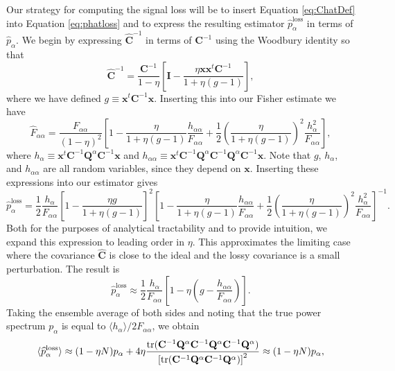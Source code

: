 \documentclass[preprint2,numberedappendix,tighten]{aastex6}  %
\newcommand{\x}{\mathbf{x}}
\newcommand{\C}{\mathbf{C}}
\newcommand{\Chat}{\mathbf{\widehat{C}}}
\newcommand{\Q}{\mathbf{Q}}
\newcommand{\I}{\mathbf{I}}
\begin{document}
Our strategy for computing the signal loss will be to insert Equation \eqref{eq:ChatDef} into Equation \eqref{eq:phatloss} and to express the resulting estimator $\widehat{p}_\alpha^\textrm{loss}$ in terms of $\widehat{p}_\alpha$. We begin by expressing $\Chat^{-1}$ in terms of $\C^{-1}$ using the Woodbury identity so that
\begin{equation}
\Chat^{-1} = \frac{\C^{-1}}{1-\eta} \left[ \I - \frac{\eta \x \x^t \C^{-1}}{1+ \eta (g-1)}\right],
\end{equation}
where we have defined $g \equiv \x^t \C^{-1} \x$. Inserting this into our Fisher estimate we have
\begin{equation}
\widehat{F}_{\alpha \alpha} = \frac{F_{\alpha \alpha}}{(1-\eta)^2} \left[ 1 -\frac{\eta }{1+ \eta (g-1)} \frac{h_{\alpha \alpha}}{F_{\alpha \alpha}} + \frac{1}{2} \left( \frac{\eta }{1+ \eta (g-1)} \right)^2 \frac{h_\alpha^2}{F_{\alpha \alpha}}\right],
\end{equation}
where $h_\alpha \equiv \x^t \C^{-1} \Q^\alpha \C^{-1} \x $ and $h_{\alpha \alpha} \equiv \x^t \C^{-1} \Q^\alpha \C^{-1} \Q^\alpha \C^{-1}\x $. Note that $g$, $h_\alpha$, and $h_{\alpha \alpha}$ are all random variables, since they depend on $\x$. Inserting these expressions into our estimator gives
\begin{equation}
\label{eq:phatlossexpanded}
\widehat{p}_\alpha^\textrm{loss} = \frac{1}{2} \frac{h_\alpha}{F_{\alpha \alpha}} \left[ 1 - \frac{\eta g}{1+ \eta (g-1)}\right]^2  \left[ 1 -\frac{\eta }{1+ \eta (g-1)} \frac{h_{\alpha \alpha}}{F_{\alpha \alpha}} + \frac{1}{2} \left( \frac{\eta }{1+ \eta (g-1)} \right)^2 \frac{h_\alpha^2}{F_{\alpha \alpha}}\right]^{-1}.
\end{equation}
Both for the purposes of analytical tractability and to provide intuition, we expand this expression to leading 
order in $\eta$. This approximates the limiting case where the covariance $\Chat$ is close to the ideal and the 
lossy covariance is a small perturbation.  The result is
\begin{equation}
\widehat{p}_\alpha^\textrm{loss} \approx \frac{1}{2} \frac{h_\alpha}{F_{\alpha \alpha}} \left[ 1 - \eta \left( g - \frac{h_{\alpha \alpha}}{F_{\alpha \alpha}}\right)\right].
\end{equation}
Taking the ensemble average of both sides and noting that the true power spectrum $p_\alpha$ is equal to $\langle h_\alpha \rangle / 2 F_{\alpha \alpha}$, we obtain
\begin{equation}
\langle \widehat{p}_\alpha^\textrm{loss} \rangle \approx (1- \eta N) p_\alpha + 4 \eta \frac{\rm{tr} (\C^{-1} \Q^\alpha \C^{-1} \Q^\alpha \C^{-1} \Q^\alpha )}{\left[ \rm{tr} (\C^{-1} \Q^\alpha \C^{-1} \Q^\alpha  ) \right]^2} \approx (1- \eta N) p_\alpha,
\end{equation}
\end{document}
